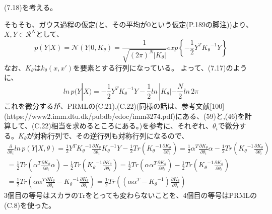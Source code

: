\documentclass{jsarticle}
\begin{document}
(7.18)を考える。

そもそも、ガウス過程の仮定(と、その平均が0という仮定(P.189の脚注))より、
$X,Y \in \mathcal{R}^N$として、
\begin{equation}
p(Y | X) = \mathcal{N}(Y | 0, K_\theta) = \frac{1}{\sqrt{(2\pi)^{N}|K_\theta|}}exp\left\{ -\frac{1}{2}Y^T {K_\theta}^{-1}Y\right\}
\end{equation}
なお、$K_\theta$は$k_\theta(x, x')$を要素とする行列になっている。
よって、(7.17)のように、
\begin{equation}
ln \, p(Y | X) = -\frac{1}{2}Y^T {K_\theta}^{-1}Y - \frac{1}{2}ln\,|K_\theta| - \frac{N}{2}ln\,2\pi
\end{equation}
これを微分するが、PRMLの(C.21),(C.22)(同様の話は、参考文献[100](https://www2.imm.dtu.dk/pubdb/edoc/imm3274.pdf)にある、(59)と,(46)を計算して、(C.22)相当を求めるところにある。)を参考に、それぞれ、$\theta_i$で微分する。$K_\theta$が対称行列で、その逆行列も対称行列になるので、
\begin{equation}
\begin{split}
\frac{\partial}{\partial \theta_i} ln\,p(Y|X,\theta) 
= \frac{1}{2}Y^T{K_\theta}^{-1}\frac{\partial K_\theta}{\partial \theta_i}{K_\theta}^{-1}Y - \frac{1}{2}Tr({K_\theta}^{-1}\frac{\partial K_\theta}{\partial \theta_i}) 
= \frac{1}{2}\alpha^T \frac{\partial K_\theta}{\partial \theta_i} \alpha - \frac{1}{2}Tr({K_\theta}^{-1}\frac{\partial K_\theta}{\partial \theta_i})\\
= \frac{1}{2}Tr(\alpha^T \frac{\partial K_\theta}{\partial \theta_i} \alpha) - \frac{1}{2}Tr({K_\theta}^{-1}\frac{\partial K_\theta}{\partial \theta_i})
= \frac{1}{2}Tr(\alpha \alpha^T \frac{\partial K_\theta}{\partial \theta_i}) - \frac{1}{2}Tr({K_\theta}^{-1}\frac{\partial K_\theta}{\partial \theta_i})\\
= \frac{1}{2}Tr(\alpha \alpha^T \frac{\partial K_\theta}{\partial \theta_i} - {K_\theta}^{-1}\frac{\partial K_\theta}{\partial \theta_i})
= \frac{1}{2}Tr((\alpha \alpha^T - {K_\theta}^{-1})\frac{\partial K_\theta}{\partial \theta_i})
\end{split}
\end{equation}
3個目の等号はスカラのTrをとっても変わらないことを、4個目の等号はPRMLの(C.8)を使った。
\end{document}
